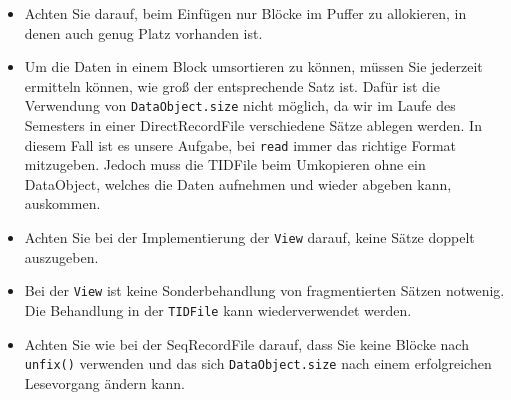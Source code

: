 \begin{itemize}
	\item Achten Sie darauf, beim Einfügen nur Blöcke im Puffer zu allokieren, in denen auch genug Platz vorhanden ist.
	\item Um die Daten in einem Block umsortieren zu können, müssen Sie jederzeit ermitteln können, wie groß der entsprechende Satz ist. Dafür ist die Verwendung von \texttt{DataObject.size} nicht möglich, da wir im Laufe des Semesters in einer DirectRecordFile verschiedene Sätze ablegen werden. In diesem Fall ist es unsere Aufgabe, bei \texttt{read} immer das richtige Format mitzugeben. Jedoch muss die TIDFile beim Umkopieren ohne ein DataObject, welches die Daten aufnehmen und wieder abgeben kann, auskommen.
	\item Achten Sie bei der Implementierung der \texttt{View} darauf, keine Sätze doppelt auszugeben.
	\item Bei der \texttt{View} ist keine Sonderbehandlung von fragmentierten Sätzen notwenig. Die Behandlung in der \texttt{TIDFile} kann wiederverwendet werden.
	\item Achten Sie wie bei der SeqRecordFile darauf, dass Sie keine Blöcke nach \texttt{unfix()} verwenden und das sich \texttt{DataObject.size} nach einem erfolgreichen Lesevorgang ändern kann.
\end{itemize}
